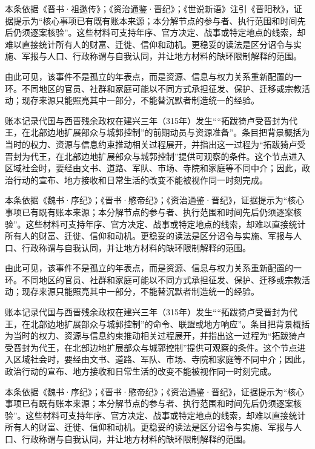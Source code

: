 本条依据《晋书·祖逖传》；《资治通鉴·晋纪》；《世说新语》注引《晋阳秋》，证据提示为“核心事项已有既有账本来源；本分解节点的参与者、执行范围和时间先后仍须逐案核验”。这些材料可支持年序、官方决定、战事或特定地点的线索，却难以直接统计所有人的财富、迁徙、信仰和动机。更稳妥的读法是区分诏令与实施、军报与人口、行政称谓与自我认同，并让地方材料的缺环限制解释的范围。

由此可见，该事件不是孤立的年表点，而是资源、信息与权力关系重新配置的一环。不同地区的官员、社群和家庭可能以不同方式承担征发、保护、迁移或宗教活动；现存来源只能照亮其中一部分，不能替沉默者制造统一的经验。

账本记录代国与西晋残余政权在建兴三年（315年）发生““拓跋猗卢受晋封为代王，在北部边地扩展部众与城郭控制”的前期动员与资源准备”。条目把背景概括为当时的权力、资源与信息约束推动相关过程展开，并指出这一过程为“拓跋猗卢受晋封为代王，在北部边地扩展部众与城郭控制”提供可观察的条件。这个节点进入区域社会时，要经由文书、道路、军队、市场、寺院和家庭等不同中介；因此，政治行动的宣布、地方接收和日常生活的改变不能被视作同一时刻完成。

本条依据《魏书·序纪》；《晋书·愍帝纪》；《资治通鉴·晋纪》，证据提示为“核心事项已有既有账本来源；本分解节点的参与者、执行范围和时间先后仍须逐案核验”。这些材料可支持年序、官方决定、战事或特定地点的线索，却难以直接统计所有人的财富、迁徙、信仰和动机。更稳妥的读法是区分诏令与实施、军报与人口、行政称谓与自我认同，并让地方材料的缺环限制解释的范围。

由此可见，该事件不是孤立的年表点，而是资源、信息与权力关系重新配置的一环。不同地区的官员、社群和家庭可能以不同方式承担征发、保护、迁移或宗教活动；现存来源只能照亮其中一部分，不能替沉默者制造统一的经验。

账本记录代国与西晋残余政权在建兴三年（315年）发生““拓跋猗卢受晋封为代王，在北部边地扩展部众与城郭控制”的命令、联盟或地方响应”。条目把背景概括为当时的权力、资源与信息约束推动相关过程展开，并指出这一过程为“拓跋猗卢受晋封为代王，在北部边地扩展部众与城郭控制”提供可观察的条件。这个节点进入区域社会时，要经由文书、道路、军队、市场、寺院和家庭等不同中介；因此，政治行动的宣布、地方接收和日常生活的改变不能被视作同一时刻完成。

本条依据《魏书·序纪》；《晋书·愍帝纪》；《资治通鉴·晋纪》，证据提示为“核心事项已有既有账本来源；本分解节点的参与者、执行范围和时间先后仍须逐案核验”。这些材料可支持年序、官方决定、战事或特定地点的线索，却难以直接统计所有人的财富、迁徙、信仰和动机。更稳妥的读法是区分诏令与实施、军报与人口、行政称谓与自我认同，并让地方材料的缺环限制解释的范围。

